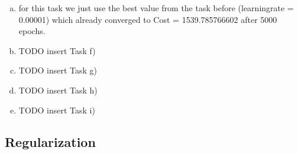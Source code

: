 \documentclass[12pt]{article}
\begin{document}
\begin{enumerate}[a)]
    \item 
        for this task we just use the best value from the task before (learningrate = 0.00001) which already converged to Cost = 1539.785766602 after 5000 epochs. 

    \item 
        TODO insert Task f)

    \item 
        TODO insert Task g)

    \item 
        TODO insert Task h)

    \item 
        TODO insert Task i)

\end{enumerate}

\subsection{Regularization}
\end{document}
